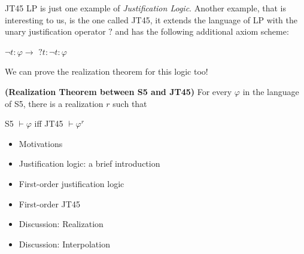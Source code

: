 \documentclass{beamer}
\theoremstyle{definition}
\newcommand{\nao}{\neg}
\newcommand{\impli}{\rightarrow}
\newcommand{\teo}{\vdash}
\begin{document}
\begin{frame} {JT45}
\qquad LP is just one example of \textit{Justification Logic}. Another example, that is interesting to us, is the one called {\color{blue}JT45}, it extends the language of LP with the unary justification operator $?$ and has the following additional axiom scheme:\\

\begin{center}
$\nao t$$:$$\varphi \impli$ $?t$$:$$\nao t$$:$$\varphi$
\end{center}
 
 \qquad We can prove the realization theorem for this logic too!  
 
 \vspace{5mm}
 
 \textbf{(Realization Theorem between S5 and JT45)} For every $\varphi$ in the language of S5, there is a realization $r$ such that
 
 \begin{center}
 	S5 $\teo \varphi$ iff JT45 $\teo \varphi^{r}$ 
 \end{center}
 
 
 
 
 
\end{frame}




\begin{frame}
	\begin{itemize}
		
		\item[] Motivations
		\vspace{5mm}
		\item[] Justification logic: a brief introduction
		\vspace{5mm}	
		\item[] {\color{blue}First-order justification logic}
		\vspace{5mm}
		\item[] First-order JT45
		\vspace{5mm}
		\item[] Discussion: Realization
		\vspace{5mm}
		\item[] Discussion: Interpolation
	\end{itemize} 
\end{frame}
\end{document}
